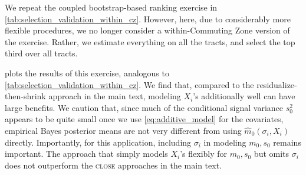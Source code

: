\documentclass[12pt, reqno]{amsart}
\newcommand{\close}{\textsc{close}}
\numberwithin{equation}{section}
\begin{document}
\begin{refsection}
\begin{appendices}
We repeat the coupled bootstrap-based ranking exercise in
\cref{tab:selection_validation_within_cz}. However, here, due to considerably more
flexible procedures, we no longer consider a within-Commuting Zone version of the
exercise. Rather, we estimate everything on all the tracts, and select the top third over
all tracts. 

 plots the results of this exercise, analogous to
\cref{tab:selection_validation_within_cz}. We find that, compared to the
residualize-then-shrink approach in the main text, modeling $X_i$'s additionally well can
have large benefits. We caution that, since much of the conditional signal variance
$s_0^2$ appears to be quite small once we use \eqref{eq:additive_model} for the
covariates, empirical Bayes posterior means are not very different from using $\hat
m_0(\sigma_i, X_i)$ directly. Importantly, for this application, including $\sigma_i$ in
modeling $m_0, s_0$ remains important. The approach that simply models $X_i$'s flexibly
for $m_0, s_0$ but omits $\sigma_i$ does not outperform the \close{} approaches in the
main text.



\printbibliography
\stopcontents
\end{appendices}
\end{refsection}

\FloatBarrier
\newpage 
\end{document}
